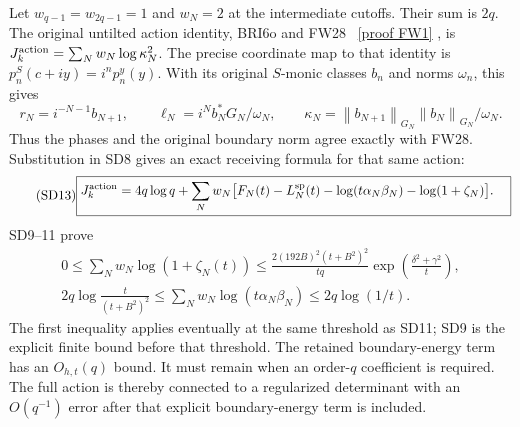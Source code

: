 \documentclass[11pt]{article}
\newcommand{\norm}[1]{\left\lVert#1\right\rVert}
\begin{document}
Let $w_{q-1}=w_{2q-1}=1$ and $w_N=2$ at the intermediate cutoffs.
Their sum is $2q$. The original untilted action identity, BRI6o and
FW28 \cite{FW}%
~\href{https://github.com/KokunoYumeto/zeta-function-research-reader/blob/5992ad50c0f2a06921f1fcaded7b4e38097c0739/workbenches/splitzero-tandem/continuations/20260920-original-kernel-mixed-determinants/providers/FULL_WINDOW_SOURCE_PRODUCTS.tex\#L28}{[proof FW1]}%
{}, is $J_k^{\rm action}=\sum_Nw_N\log\kappa_N^2$.
The precise coordinate map to that identity is
$p_n^S(c+iy)=i^np_n^y(y)$. With its original $S$-monic classes $b_n$
and norms $\omega_n$, this gives
\[
r_N=i^{-N-1}b_{N+1},\qquad
\ell_N=i^N b_N^*G_N/\omega_N,\qquad
\kappa_N=\norm{b_{N+1}}_{G_N}\norm{b_N}_{G_N}/\omega_N.
\]
Thus the phases and the original boundary norm agree exactly with FW28.
Substitution in SD8 gives an exact receiving formula for that same
action:
\begin{equation}\tag{SD13}
\boxed{\begin{aligned}
J_k^{\rm action}={}&4q\log q+
\sum_Nw_N\bigl[F_N(t)-L_N^{\rm sp}(t)
-\log(t\alpha_N\beta_N)-\log(1+\zeta_N)\bigr].
\end{aligned}}
\end{equation}
SD9--11 prove
\begin{equation}\tag{SD14}
\begin{gathered}
0\le\sum_Nw_N\log(1+\zeta_N(t))
\le\frac{2(192B)^2(t+B^2)^2}{tq}
\exp\!\left(\frac{\delta^2+\gamma^2}{t}\right),\\
2q\log\frac{t}{(t+B^2)^2}
\le\sum_Nw_N\log(t\alpha_N\beta_N)
\le2q\log(1/t).
\end{gathered}
\end{equation}
The first inequality applies eventually at the same threshold as SD11;
SD9 is the explicit finite bound before that threshold. The retained
boundary-energy term has an $O_{h,t}(q)$ bound. It must remain when an
order-$q$ coefficient is required. The full action is thereby connected
to a regularized determinant with an $O(q^{-1})$ error after that
explicit boundary-energy term is included.
\end{document}
